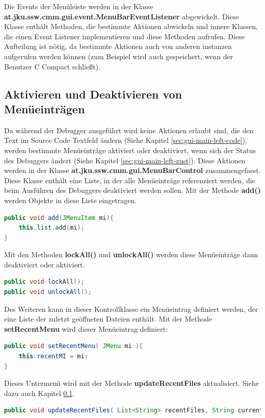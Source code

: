 Die Events der Menüleiste werden in der Klasse \textbf{at.jku.ssw.cmm.gui.event.MenuBarEventListener} abgewickelt. Diese Klasse enthält Methoden, die bestimmte Aktionen abwickeln und innere Klassen, die einen Event Listener implementieren und diese Methoden aufrufen. Diese Aufteilung ist nötig, da bestimmte Aktionen auch von anderen instanzen aufgerufen werden können (zum Beispiel wird auch gespeichert, wenn der Benutzer C Compact schließt).

\subsection{Aktivieren und Deaktivieren von Menüeinträgen}
Da während der Debugger ausgeführt wird keine Aktionen erlaubt sind, die den Text im Source Code Textfeld ändern (Siehe Kapitel \ref{sec:gui-main-left-code}), werden bestimmte Menüeinträge aktiviert oder deaktiviert, wenn sich der Status des Debuggers ändert (Siehe Kapitel \ref{sec:gui-main-left-zust}). Diese Aktionen werden in der Klasse \textbf{at.jku.ssw.cmm.gui.MenuBarControl} zusammengefasst. Diese Klasse enthält eine Liste, in der alle Menüeinträge referenziert werden, die beim Ausführen des Debuggers deaktiviert werden sollen. Mit der Methode \textbf{add()} werden Objekte in diese Liste eingetragen.
\begin{lstlisting}[language=JAVA]
public void add(JMenuItem mi){
	this.list.add(mi);
}
\end{lstlisting}

Mit den Methoden \textbf{lockAll()} und \textbf{unlockAll()} werden diese Menüeinträge dann deaktiviert oder aktiviert.

\begin{lstlisting}[language=JAVA]
public void lockAll();
public void unlockAll();
\end{lstlisting}

Des Weiteren kann in dieser Kontrollklasse ein Menüeintrag definiert werden, der eine Liste der zuletzt geöffneten Dateien enthält. Mit der Methode \textbf{setRecentMenu} wird dieser Menüeintrag definiert:
\begin{lstlisting}[language=JAVA]
public void setRecentMenu( JMenu mi ){
	this.recentMI = mi;
}
\end{lstlisting}

Dieses Untermenü wird mit der Methode \textbf{updateRecentFiles} aktualisiert. Siehe dazu auch Kapitel \ref{}.
\begin{lstlisting}[language=JAVA]
public void updateRecentFiles( List<String> recentFiles, String currentFile );
\end{lstlisting}

